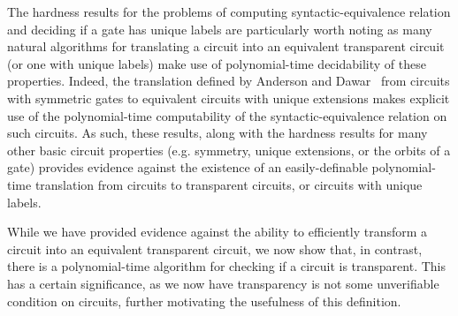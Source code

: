 \documentclass[../paper.tex]{subfiles}
\begin{document}
The hardness results for the problems of computing syntactic-equivalence
relation and deciding if a gate has unique labels are particularly worth noting
as many natural algorithms for translating a circuit into an equivalent
transparent circuit (or one with unique labels) make use of polynomial-time
decidability of these properties. Indeed, the translation defined by Anderson
and Dawar~\cite{AndersonD17} from circuits with symmetric gates to equivalent
circuits with unique extensions makes explicit use of the polynomial-time
computability of the syntactic-equivalence relation on such circuits. As such,
these results, along with the hardness results for many other basic circuit
properties (e.g. symmetry, unique extensions, or the orbits of a gate) provides
evidence against the existence of an easily-definable polynomial-time
translation from circuits to transparent circuits, or circuits with unique
labels.




While we have provided evidence against the ability to efficiently transform a
circuit into an equivalent transparent circuit, we now show that, in contrast,
there is a polynomial-time algorithm for checking if a circuit is transparent.
This has a certain significance, as we now have transparency is not some
unverifiable condition on circuits, further motivating the usefulness of this
definition.
\end{document}
